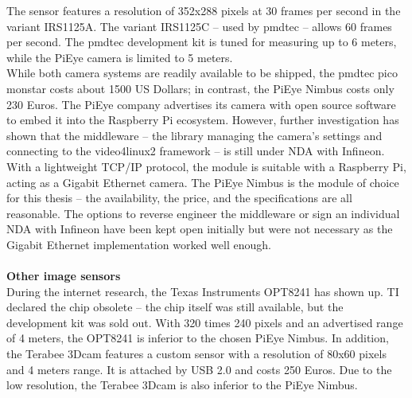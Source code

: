 The sensor features a resolution of 352x288 pixels at 30 frames per second in the variant IRS1125A. The variant IRS1125C – used by pmdtec – allows 60 frames per second. The pmdtec development kit is tuned for measuring up to 6 meters, while the PiEye camera is limited to 5 meters.\\
While both camera systems are readily available to be shipped, the pmdtec pico monstar costs about 1500 US Dollars; in contrast, the PiEye Nimbus costs only 230 Euros. The PiEye company advertises its camera with open source software to embed it into the Raspberry Pi ecosystem. However, further investigation has shown that the middleware – the library managing the camera’s settings and connecting to the video4linux2 framework – is still under NDA with Infineon. \\
With a lightweight TCP/IP protocol, the module is suitable with a Raspberry Pi, acting as a Gigabit Ethernet camera. The PiEye Nimbus is the module of choice for this thesis – the availability, the price, and the specifications are all reasonable. The options to reverse engineer the middleware or sign an individual NDA with Infineon have been kept open initially but were not necessary as the Gigabit Ethernet implementation worked well enough.\\
\\
\textbf{Other image sensors}\\
During the internet research, the Texas Instruments OPT8241 has shown up. TI declared the chip obsolete – the chip itself was still available, but the development kit was sold out. With 320 times 240 pixels and an advertised range of 4 meters, the OPT8241 is inferior to the chosen PiEye Nimbus. In addition, the Terabee 3Dcam features a custom sensor with a resolution of 80x60 pixels and 4 meters range. It is attached by USB 2.0 and costs 250 Euros. Due to the low resolution, the Terabee 3Dcam is also inferior to the PiEye Nimbus. 


